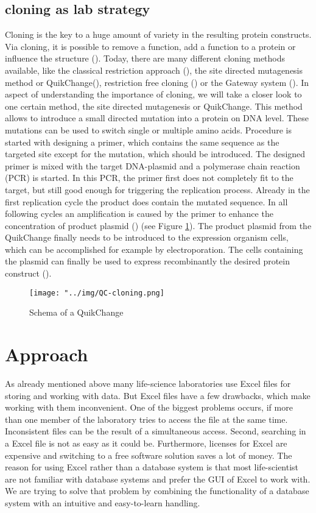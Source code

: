 \documentclass{bioinfo}
\begin{document}
\subsection{cloning as lab strategy}
Cloning is the key to a huge amount of variety in the resulting protein constructs. Via cloning, it 
is possible to remove a function, add a function to a protein or influence the structure (\citealp{Clark1}). 
Today, there are many different cloning methods available, like the classical restriction approach 
(\citealp{Clark1}), the site directed mutagenesis method or QuikChange\textregistered (\citealp{Quik}), 
restriction free cloning (\citealp{VanDenEnt}) or the Gateway system (\citealp{Clark1}). In aspect 
of understanding the importance of cloning, we will take a closer look to one certain method, the 
site directed mutagenesis or QuikChange\textregistered. This method allows to introduce a small 
directed mutation into a protein on DNA level. These mutations can be used to switch single or 
multiple amino acids. Procedure is started with designing a primer, which contains the same sequence 
as the targeted site except for the mutation, which should be introduced. The designed primer is 
mixed with the target DNA-plasmid and a polymerase chain reaction (PCR) is started. In this PCR, the 
primer first does not completely fit to the target, but still good enough for triggering the replication 
process. Already in the first replication cycle the product does contain the mutated sequence. In 
all following cycles an amplification is caused by the primer to enhance the concentration of 
product plasmid (\citealp{Quik}) (see Figure \ref{QC-pic}). The product plasmid from the QuikChange\textregistered 
finally needs to be introduced to the expression organism cells, which can be accomplished for example 
by electroporation. The cells containing the plasmid can finally be used to express recombinantly 
the desired protein construct (\citealp{Mülhardt1}).

\begin{figure}
	\texttt{[image: "../img/QC-cloning.png]}
	\caption{Schema of a QuikChange\textregistered  }
	\label{QC-pic}
\end{figure}

\section{Approach}
As already mentioned above many life-science laboratories use Excel files for storing and working with 
data. But Excel files have a few drawbacks, which make working with them inconvenient. One of the 
biggest problems occurs, if more than one member of the laboratory tries to access the file at the 
same time. Inconsistent files can be the result of a simultaneous access. Second, searching in a Excel file is not as easy as 
it could be. Furthermore, licenses for Excel are expensive and switching to a free software solution 
saves a lot of money. The reason for using Excel rather than a database system is that most life-scientist 
are not familiar with database systems and prefer the GUI of Excel to work with. We are 
trying to solve that problem by combining the functionality of a database system with an intuitive and 
easy-to-learn handling.
\end{document}
